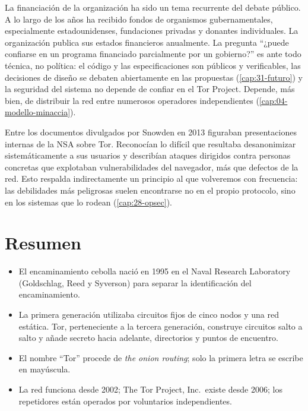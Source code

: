 La financiación de la organización ha sido un tema recurrente del debate público. A lo largo de los años ha recibido fondos de organismos gubernamentales, especialmente estadounidenses, fundaciones privadas y donantes individuales. La organización publica sus estados financieros anualmente. La pregunta \enquote{¿puede confiarse en un programa financiado parcialmente por un gobierno?} es ante todo técnica, no política: el código y las especificaciones son públicos y verificables, las decisiones de diseño se debaten abiertamente en las propuestas (\cref{cap:31-futuro}) y la seguridad del sistema no depende de confiar en el Tor Project. Depende, más bien, de distribuir la red entre numerosos operadores independientes (\cref{cap:04-modello-minaccia}).

\begin{approfondimento}
Entre los documentos divulgados por Snowden en 2013 figuraban presentaciones internas de la NSA sobre Tor. Reconocían lo difícil que resultaba desanonimizar sistemáticamente a sus usuarios y describían ataques dirigidos contra personas concretas que explotaban vulnerabilidades del navegador, más que defectos de la red. Esto respalda indirectamente un principio al que volveremos con frecuencia: las debilidades más peligrosas suelen encontrarse no en el propio protocolo, sino en los sistemas que lo rodean (\cref{cap:28-opsec}).
\end{approfondimento}

\section*{Resumen}
\begin{itemize}
  \item El encaminamiento cebolla nació en 1995 en el Naval Research Laboratory (Goldschlag, Reed y Syverson) para separar la identificación del encaminamiento.
  \item La primera generación utilizaba circuitos fijos de cinco nodos y una red estática. Tor, perteneciente a la tercera generación, construye circuitos salto a salto y añade secreto hacia adelante, directorios y puntos de encuentro.
  \item El nombre \enquote{Tor} procede de \emph{the onion routing}; solo la primera letra se escribe en mayúscula.
  \item La red funciona desde 2002; The Tor Project, Inc.\ existe desde 2006; los repetidores están operados por voluntarios independientes.
\end{itemize}

